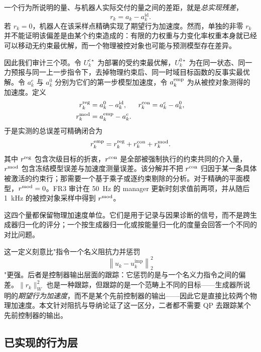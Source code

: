 \documentclass[journal]{IEEEtran}
\begin{document}
一个行为所说明的量、与机器人实际交付的量之间的差距，就是\emph{总实现残差}，
\begin{equation}
r_k=a_k-a_k^{\mathrm{id}}.
\end{equation}
若 $r_k=0$，机器人在该采样点精确实现了期望行为加速度。然而，单独的非零 $r_k$ 并不能证明该偏差是由某个约束造成的：有限的力权重与力变化率权重本身就已经可以移动无约束最优解，而一个物理被控对象也可能与预测模型存在差异。

因此我们审计三个项。令 $U_k^{c\star}$ 为部署的受约束最优解，$U_k^{0\star}$ 为在同一状态、同一力预报与同一上一步指令下，去掉物理约束后、同一时域目标函数的反事实最优解。令 $a_k^c$ 与 $a_k^0$ 分别为它们的第一步模型加速度，令 $a_k^{\rm emp}$ 为从被控对象测得的加速度。定义
\begin{align}
r_k^{\rm reg}&=a_k^0-a_k^{\rm id}, &
r_k^{\rm con}&=a_k^c-a_k^0,\\
r_k^{\rm mod}&=a_k^{\rm emp}-a_k^c. &&
\end{align}
于是实测的总误差可精确闭合为
\begin{equation}
r_k^{\rm emp}=r_k^{\rm reg}+r_k^{\rm con}+r_k^{\rm mod}.
\label{eq:residual-decomposition}
\end{equation}
其中 $r^{\rm reg}$ 包含次级目标的折衷，$r^{\rm con}$ 是全部被强制执行的约束共同的介入量，$r^{\rm mod}$ 包含冻结模型误差与加速度测量误差。该分解并不把 $r^{\rm con}$ 归因于某一条具体被激活的约束行；那需要一个基于乘子或逐约束剔除的分析。对于精确的平面模型，$r^{\rm mod}=0$。FR3 审计在 50~Hz 的 manager 更新时刻求值前两项，并从随后 1~kHz 的被控对象采样中得到 $r^{\rm mod}$。

这四个量都保留物理加速度单位。它们是用于记录与因果诊断的信号，而不是跨生成器归一化的评分；一个按生成器归一化或按能量归一化的度量会回答一个不同的对比问题。

这一定义刻意比"指令一个名义阻抗力并惩罚
\begin{equation}
\left\|u_k-u_k^{\mathrm{imp}}\right\|_2^2
\end{equation}
"更强。后者是控制器输出层面的跟踪：它惩罚的是与一个名义力指令之间的偏差。$\|r_k\|_W^2$ 也是一种跟踪，但跟踪的是一个范畴上不同的目标——生成器所说明的\emph{期望行为加速度}，而不是某个先前控制器的输出——因此它是直接比较两个物理加速度。本文针对阻抗与导纳论证了这一区分，二者都不需要 QP 去跟踪某个先前控制器的输出。

\subsection{已实现的行为层}
\label{sec:generators}
\end{document}
